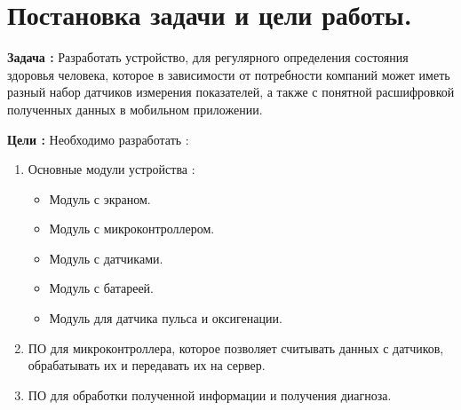 \documentclass[a4document]{article}
\begin{document}
{
\newpage
\section*{Постановка задачи и цели работы.} 

\par\noindent
\textbf{Задача :}
\newline
Разработать устройство, для регулярного определения состояния здоровья человека, 
которое в зависимости от потребности компаний может иметь разный набор датчиков измерения показателей,
а также с понятной расшифровкой полученных данных в мобильном приложении. 

\bigbreak
\par\noindent
\textbf{Цели :}
\newline
Необходимо разработать : 
\begin{enumerate}
    \item Основные модули устройства : 
    \begin{itemize}
        \item Модуль с экраном.
        \item Модуль с микроконтроллером.
        \item Модуль с датчиками. 
        \item Модуль с батареей.
        \item Модуль для датчика пульса и оксигенации.
    \end{itemize}
    \item ПО для микроконтроллера, которое позволяет считывать данных с датчиков, обрабатывать их и передавать их на сервер.
    \item ПО для обработки полученной информации и получения диагноза.
\end{enumerate}

}
\end{document}
